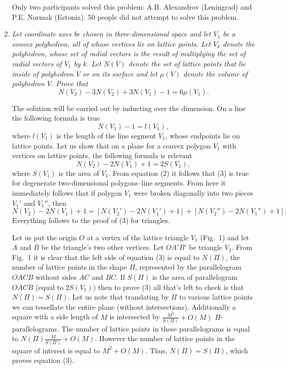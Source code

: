 \documentclass[12pt]{amsart}
\begin{document}
\begin{enumerate}
Only two participants solved this problem: A.B. Alexandrov (Leningrad) and P.E.
Normak (Estonia).
50 people did not attempt to solve this problem.
\item
\textit{Let coordinate axes be chosen in three-dimensional space and let $V_1$
be a convex polyhedron, all of whose vertices lie on lattice points.
Let $V_k$ denote the polyhedron, whose set of radial vectors is the result of
multiplying the set of radial vectors of $V_1$ by $k$.
Let $N(V)$ denote the set of lattice points that lie inside of polyhedron $V$ or
on its surface and let $\mu(V)$ denote the volume of polyhedron $V$.
Prove that}
\begin{equation}
N(V_3)-3N(V_2)+3N(V_1)-1=6\mu(V_1).
\end{equation}

The solution will be carried out by inducting over the dimension.
On a line the following formula is true
\begin{equation}
N(V_1)-1=l(V_1),
\end{equation}
where $l(V_1)$ is the length of the line segment $V_1$, whose endpoints lie on
lattice points.
Let us show that on a plane for a convex polygon $V_1$ with vertices on lattice
points, the following formula is relevant
\begin{equation}
N(V_2)-2N(V_1)+1=2S(V_1),
\end{equation}
where $S(V_1)$ is the area of $V_1$.
From equation (2) it follows that (3) is true for degenerate two-dimensional
polygons--line segments.
From here it immediately follows that if polygon $V_1$ were broken diagonally
into two pieces $V_1'$ and $V_1''$, then
$$N(V_2)-2N(V_1)+1=[N(V_2')-2N(V_1')+1]+[N(V_2'')-2N(V_1'')+1].$$
Everything follows to the proof of (3) for triangles.

Let us put the origin $O$ at a vertex of the lattice triangle $V_1$ (Fig.~1) and
let $A$ and $B$ be the triangle's two other vertices.
Let $OA'B'$ be triangle $V_2$.
From Fig.~1 it is clear that the left side of equation (3) is equal to $N(\Pi)$,
the number of lattice points in the shape $\Pi$, represented by the
parallelogram $OACB$ without sides $AC$ and $BC$.
If $S(\Pi)$ is the area of parallelogram $OACB$ (equal to $2S(V_1)$) then to
prove (3) all that's left to check is that $N(\Pi)=S(\Pi)$.
Let us note that translating by $\Pi$ to various lattice points we can
tessellate the entire plane (without intersections).
Additionally a square with a side length of $M$ is intersected by
$\displaystyle\frac{M^2}{S(\Pi)}+O(M)$ $\Pi$-parallelograms.
The number of lattice points in these parallelograms is equal to
$\displaystyle N(\Pi)\frac{M}{S(\Pi)}+O(M)$.
However the number of lattice points in the square of interest is equal to
$M^2+O(M)$.
Thus, $N(\Pi)=S(\Pi)$, which proves equation (3).


\end{enumerate}
\end{document}
